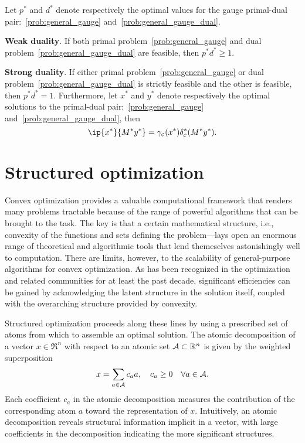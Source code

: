 \begin{theorem} 
    Let $p^*$ and $d^*$ denote respectively the optimal values for the gauge primal-dual pair:~\eqref{prob:general_gauge} and~\eqref{prob:general_gauge_dual}. 
    \item \textbf{Weak duality}. If both primal problem~\eqref{prob:general_gauge} and dual problem~\eqref{prob:general_gauge_dual} are feasible, then $p^* d^* \geq 1$. 
    \item \textbf{Strong duality}. If either primal problem~\eqref{prob:general_gauge} or dual problem~\eqref{prob:general_gauge_dual} is strictly feasible and the other is feasible, then $p^* d^* = 1$. Furthermore, let $x^*$ and $y^*$ denote respectively the optimal solutions to the primal-dual pair:~\eqref{prob:general_gauge} and~\eqref{prob:general_gauge_dual}, then 
    \[\ip{x^*}{M^*y^*} = \gauge\Cs(x^*)\delta\Cs^*(M^*y^*).\]
    
\end{theorem}

\section{Structured optimization}

Convex optimization provides a valuable computational framework that renders many problems tractable because of the range of powerful algorithms that can be brought to the task. The key is that a certain mathematical structure, i.e., convexity of the functions and sets defining the problem—lays open an enormous range of theoretical and algorithmic tools that lend themeselves astonishingly well to computation. There are limits, however, to the scalability of general-purpose algorithms for convex optimization. As has been recognized in the optimization and related communities for at least the past decade, significant efficiencies can be gained by acknowledging the latent structure in the solution itself, coupled with the overarching structure provided by convexity.

Structured optimization proceeds along these lines by using a prescribed set of atoms from which to assemble an optimal solution. The atomic decomposition of a vector $x\in\Re^n$ with respect to an atomic set
$\mathcal{A}\subset\mathbb{R}^n$ is given by the weighted superposition
\begin{equation}
  x = \sum_{a\in\mathcal{A}} c_a a, \quad c_a\ge0 \quad \forall a\in\mathcal{A}.
\end{equation}
Each coefficient $c_a$ in the atomic decomposition measures the contribution of
the corresponding atom $a$ toward the representation of $x$. Intuitively, an
atomic decomposition reveals structural information implicit in a vector, with
large coefficients in the decomposition indicating the more significant
structures.

